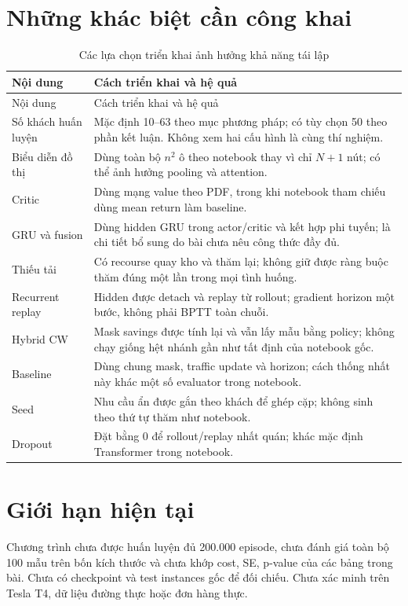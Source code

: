 \documentclass[12pt,a4paper,oneside]{report}
\begin{document}
\section{Những khác biệt cần công khai}
\begin{longtable}{@{}p{3.3cm}p{11.2cm}@{}}
\caption{Các lựa chọn triển khai ảnh hưởng khả năng tái lập}\label{tab:limits}\\
\toprule
Nội dung & Cách triển khai và hệ quả\\
\midrule
\endfirsthead
\toprule Nội dung & Cách triển khai và hệ quả\\\midrule
\endhead
\bottomrule
\endfoot
Số khách huấn luyện & Mặc định 10--63 theo mục phương pháp; có tùy chọn 50 theo phần kết luận. Không xem hai cấu hình là cùng thí nghiệm.\\
Biểu diễn đồ thị & Dùng toàn bộ $n^2$ ô theo notebook thay vì chỉ $N+1$ nút; có thể ảnh hưởng pooling và attention.\\
Critic & Dùng mạng value theo PDF, trong khi notebook tham chiếu dùng mean return làm baseline.\\
GRU và fusion & Dùng hidden GRU trong actor/critic và kết hợp phi tuyến; là chi tiết bổ sung do bài chưa nêu công thức đầy đủ.\\
Thiếu tải & Có recourse quay kho và thăm lại; không giữ được ràng buộc thăm đúng một lần trong mọi tình huống.\\
Recurrent replay & Hidden được detach và replay từ rollout; gradient horizon một bước, không phải BPTT toàn chuỗi.\\
Hybrid CW & Mask savings được tính lại và vẫn lấy mẫu bằng policy; không chạy giống hệt nhánh gần như tất định của notebook gốc.\\
Baseline & Dùng chung mask, traffic update và horizon; cách thống nhất này khác một số evaluator trong notebook.\\
Seed & Nhu cầu ẩn được gắn theo khách để ghép cặp; không sinh theo thứ tự thăm như notebook.\\
Dropout & Đặt bằng 0 để rollout/replay nhất quán; khác mặc định Transformer trong notebook.\\
\end{longtable}

\section{Giới hạn hiện tại}
Chương trình chưa được huấn luyện đủ 200.000 episode, chưa đánh giá toàn
bộ 100 mẫu trên bốn kích thước và chưa khớp cost, SE, p-value của các
bảng trong bài. Chưa có checkpoint và test instances gốc để đối chiếu.
Chưa xác minh trên Tesla T4, dữ liệu đường thực hoặc đơn hàng thực.
\end{document}
